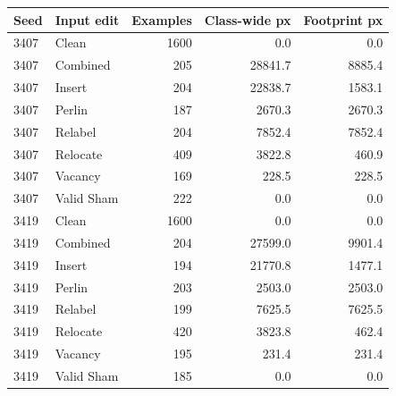 \begin{tabular}{llrrr}
\toprule
Seed & Input edit & Examples & Class-wide px & Footprint px \\
\midrule
3407 & Clean & 1600 & 0.0 & 0.0 \\
3407 & Combined & 205 & 28841.7 & 8885.4 \\
3407 & Insert & 204 & 22838.7 & 1583.1 \\
3407 & Perlin & 187 & 2670.3 & 2670.3 \\
3407 & Relabel & 204 & 7852.4 & 7852.4 \\
3407 & Relocate & 409 & 3822.8 & 460.9 \\
3407 & Vacancy & 169 & 228.5 & 228.5 \\
3407 & Valid Sham & 222 & 0.0 & 0.0 \\
\midrule
3419 & Clean & 1600 & 0.0 & 0.0 \\
3419 & Combined & 204 & 27599.0 & 9901.4 \\
3419 & Insert & 194 & 21770.8 & 1477.1 \\
3419 & Perlin & 203 & 2503.0 & 2503.0 \\
3419 & Relabel & 199 & 7625.5 & 7625.5 \\
3419 & Relocate & 420 & 3823.8 & 462.4 \\
3419 & Vacancy & 195 & 231.4 & 231.4 \\
3419 & Valid Sham & 185 & 0.0 & 0.0 \\
\bottomrule
\end{tabular}
